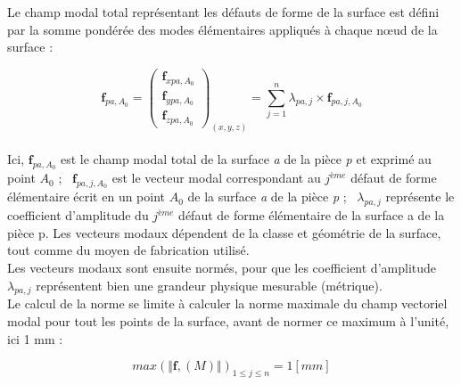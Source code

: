 \documentclass[a4paper,10pt]{article}
\begin{document}
Le champ modal total représentant les défauts de forme de la surface est défini par la somme pondérée des modes élémentaires appliqués à chaque nœud de la surface :

\begin{equation}
\textbf{f}_{pa,A_{0}} = 
\begin{pmatrix}
\textbf{f}_{xpa,A_{0}} \\
\textbf{f}_{ypa,A_{0}} \\
\textbf{f}_{zpa,A_{0}} 
\end{pmatrix}_{(x,y,z)} = 
\sum_{j=1}^{n}\lambda_{pa,j}\times\textbf{f}_{pa,j,A_{0}}
\end{equation} \\


Ici, $ \textbf{f}_{pa,A_{0}} $ est le champ modal total de la surface \textit{a} de la pièce \textit{p} et exprimé au point $ \textit{A}_{0} $ ; \ $ \textbf{f}_{pa,j,A_{0}} $ est le vecteur modal correspondant au $j^{ème}$ défaut de forme élémentaire écrit en un point $\textit{A}_{0}$ de la surface \textit{a} de la pièce \textit{p} ; \ $\lambda_{pa,j}$ représente le coefficient d'amplitude du $j^{ème}$ défaut de forme élémentaire de la surface a de la pièce p. Les vecteurs modaux dépendent de la classe et géométrie de la surface, tout comme du moyen de fabrication utilisé. \\ 


Les vecteurs modaux sont ensuite normés, pour que les coefficient d'amplitude $\lambda_{pa,j}$ représentent bien une grandeur physique mesurable (métrique).\\
Le calcul de la norme se limite à calculer la norme maximale du champ vectoriel modal pour tout les points de la surface, avant de normer ce maximum à l'unité, ici 1 mm : 

\begin{equation}
max(\Vert\textbf{f},(M)\Vert)_{1\leq j\leq n} = 1[mm]
\end{equation}\\
\end{document}
